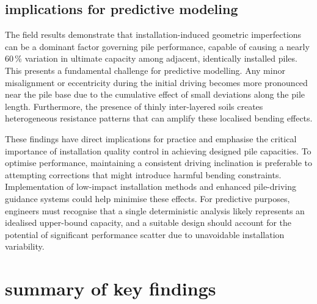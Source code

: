 {{{{{{\subsection{implications for predictive modeling}
\label{subsec:implications_for_modeling}

The field results demonstrate that installation-induced geometric imperfections can be a dominant factor governing pile performance, capable of causing a nearly 60\,\% variation in ultimate capacity among adjacent, identically installed piles. This presents a fundamental challenge for predictive modelling. Any minor misalignment or eccentricity during the initial driving becomes more pronounced near the pile base due to the cumulative effect of small deviations along the pile length. Furthermore, the presence of thinly inter-layered soils creates heterogeneous resistance patterns that can amplify these localised bending effects.

These findings have direct implications for practice and emphasise the critical importance of installation quality control in achieving designed pile capacities. To optimise performance, maintaining a consistent driving inclination is preferable to attempting corrections that might introduce harmful bending constraints. Implementation of low-impact installation methods and enhanced pile-driving guidance systems could help minimise these effects. For predictive purposes, engineers must recognise that a single deterministic analysis likely represents an idealised upper-bound capacity, and a suitable design should account for the potential of significant performance scatter due to unavoidable installation variability.

\section{summary of key findings}
\label{sec:summary_field_investigation}

}}}}}}
